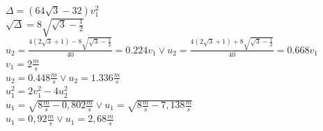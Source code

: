 \documentclass[14pt]{extarticle}
\begin{document}
        $\Delta = \left(64\sqrt{{3}}-32\right)v_1^2 $\\
        $\sqrt{{\Delta}} = 8\sqrt{{\sqrt{3}-\frac{1}{2}}} $\\
        $u_2 = \frac{4\left(2\sqrt{3}+1\right)-8\sqrt{{\sqrt{3}-\frac{1}{2}}}}{40}=0.224v_1 \lor
        u_2 = \frac{4\left(2\sqrt{3}+1\right)+8\sqrt{{\sqrt{3}-\frac{1}{2}}}}{40}=0.668v_1$ \\
        $v_1=2 \frac{m}{s}$\\
        $u_2 = 0.448\frac{m}{s} \lor u_2 = 1.336\frac{m}{s}$\\
        $u_1^2=2v_1^2-4u_2^2$\\
        $u_1=\sqrt{8\frac{m}{s}-0,802\frac{m}{s}} \lor u_1=\sqrt{8\frac{m}{s}-7,138\frac{m}{s}} $\\
        $ u_1=0,92\frac{m}{s} \lor u_1=2,68\frac{m}{s} $\\
       
       
\end{document}
